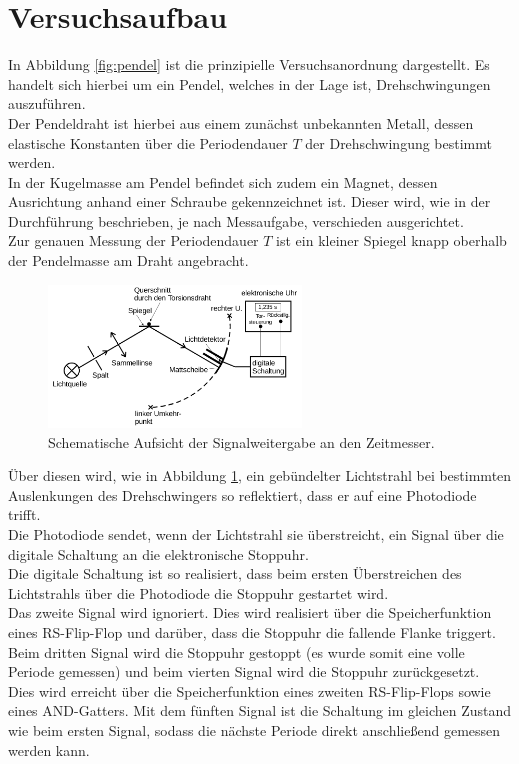 \section{Versuchsaufbau}
\label{sec:Versuchsaufbau}
In Abbildung \ref{fig:pendel} ist die prinzipielle Versuchsanordnung dargestellt. Es handelt sich hierbei um ein Pendel, welches in der Lage ist, Drehschwingungen auszuführen.\\
Der Pendeldraht ist hierbei aus einem zunächst unbekannten Metall, dessen elastische Konstanten über die Periodendauer $T$ der Drehschwingung bestimmt werden. \\
In der Kugelmasse am Pendel befindet sich zudem ein Magnet, dessen Ausrichtung anhand einer Schraube gekennzeichnet ist. Dieser wird, wie in der Durchführung beschrieben, je nach Messaufgabe, verschieden ausgerichtet.\\
Zur genauen Messung der Periodendauer $T$ ist ein kleiner Spiegel knapp oberhalb der Pendelmasse am Draht angebracht.


\begin{figure}
	\begin{center}
		\includegraphics[width=0.6\textwidth]{Bilder/spiegelding.png}
	\end{center}
	\caption{Schematische Aufsicht der Signalweitergabe an den Zeitmesser. \cite{Anleitung}}
	\label{fig:licht}

\end{figure}
Über diesen wird, wie in Abbildung \ref{fig:licht}, ein gebündelter Lichtstrahl bei bestimmten Auslenkungen des Drehschwingers so reflektiert, dass er auf eine Photodiode trifft.\\
Die Photodiode sendet, wenn der Lichtstrahl sie überstreicht, ein Signal über die digitale Schaltung an die elektronische Stoppuhr.\\
Die digitale Schaltung ist so realisiert, dass beim ersten Überstreichen des Lichtstrahls über die Photodiode die Stoppuhr gestartet wird.\\
Das zweite Signal wird ignoriert. Dies wird realisiert über die Speicherfunktion eines RS-Flip-Flop und darüber, dass die Stoppuhr die fallende Flanke triggert.
Beim dritten Signal wird die Stoppuhr gestoppt (es wurde somit eine volle Periode gemessen) und beim vierten Signal wird die Stoppuhr zurückgesetzt.\\
Dies wird erreicht über die Speicherfunktion eines zweiten RS-Flip-Flops sowie eines AND-Gatters. Mit dem fünften Signal ist die Schaltung im gleichen Zustand wie beim ersten Signal, sodass die nächste Periode direkt anschließend gemessen werden kann.

